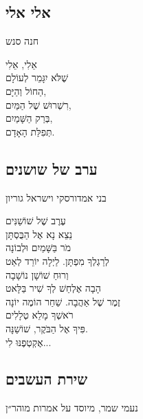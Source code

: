 \documentclass[11pt,twoside]{article}
\newcommand{\instruction}[1]{%
\ifhmode\else\noindent\fi%
{\plain\tiny{#1}}%
}
\begin{document}
{{\newpage


\subsection{אלי אלי}
\vspace{-\baselineskip}%
{\centering\instruction{חנה סנש}\par}
\vfill%
אֵלִי, אֵלִי\\
שֶׁלֹּא יִגָּמֵר לְעוֹלָם\\
הַחוֹל וְהַיָּם,\\
רִשְׁרוּשׁ שֶׁל הַמַּיִם,\\
בְּרַק הַשָּׁמַיִם,\\
תְּפִלַּת הָאָדָם.
\vfill%
\subsection{ערב של שושנים}
\vspace{-\baselineskip}%
{\centering\instruction{בני אמדורסקי וישראל גוריון}\par}
\vfill%
עֶרֶב שֶׁל שׁוֹשַׁנִּים\\
נֵצֵא נָא אֶל הַבֻּסְתָּן\\
מֹר בַּשָּׁמַיִם וּלְבוֹנָה\\
לְרַגְלְךָ מִפְתָּן.
\vfill%
לַיְלָה יוֹרֵד לְאַט\\
וְרוּחַ שׁוֹשָׁן נוֹשָׁבָה\\
הָבָה אֶלְחַשׁ לְךָ שִׁיר בַּלָּאט\\
זֶמֶר שֶׁל אַהֲבָה.
\vfill%
שַׁחַר הוֹמֶה יוֹנָה\\
רֹאשְׁךָ מָלֵא טְלָלִים\\
פִּיךָ אֶל הַבֹּקֶר, שׁוֹשַׁנָּה.\\
אֶקְטְפֶנּוּ לִי...

\newpage
\subsection{שירת העשבים}
\vspace{-\baselineskip}%
{\centering\instruction{נעמי שמר, מיוסד על אמרות מוהר״ן}\par}

}}
\end{document}
